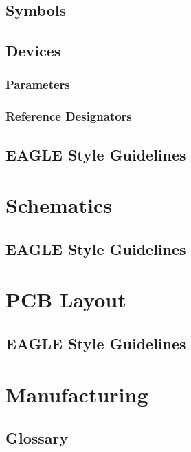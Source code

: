 \documentclass[12pt,article]{memoir}
\begin{document}
\section{Symbols}

\section{Devices}

\subsection{Parameters}

\subsection{Reference Designators}

\section{EAGLE Style Guidelines}

\newpage

\chapter{Schematics}

\section{EAGLE Style Guidelines}

\newpage

\chapter{PCB Layout}

\section{EAGLE Style Guidelines}

\newpage

\chapter{Manufacturing}

\begin{appendix}

\chapter{Glossary}

\end{appendix}
\end{document}
